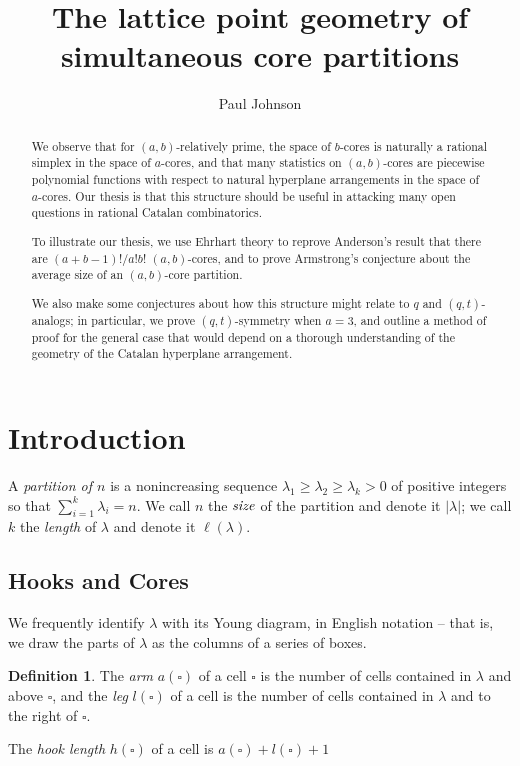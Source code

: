 \documentclass{amsart}[12pt]
\theoremstyle{definition}
\newtheorem{definition}[dummy]{Definition}
\begin{document}
\title{The lattice point geometry of simultaneous core partitions}
\begin{abstract}
We observe that for $(a,b)$-relatively prime, the space of $b$-cores is naturally a rational simplex in the space of $a$-cores, and that many statistics on $(a,b)$-cores are piecewise polynomial functions with respect to natural hyperplane arrangements in the space of $a$-cores.  Our thesis is that this structure should be useful in attacking many open questions in rational Catalan combinatorics.

To illustrate our thesis, we use Ehrhart theory to reprove Anderson's result \cite{anderson} that there are $(a+b-1)!/a!b!$ $(a,b)$-cores, and to prove Armstrong's conjecture \cite{AHJ} about the average size of an $(a,b)$-core partition.

  We also make some conjectures about how this structure might relate to $q$ and $(q,t)$-analogs; in particular, we prove $(q,t)$-symmetry when $a=3$, and outline a method of proof for the general case that would depend on a thorough understanding of the geometry of the Catalan hyperplane arrangement.
\end{abstract}


\author{Paul Johnson}
\date{}
\maketitle
\section{Introduction}

A \emph{partition of $n$} is a nonincreasing sequence $\lambda_1\geq \lambda_2\geq
\lambda_{k}> 0$ of positive integers so that $\sum_{i=1}^k \lambda_i=n$.  We
call $n$ the $\emph{size}$ of the partition and denote it $|\lambda|$; we call
$k$ the \emph{length} of $\lambda$ and denote it $\ell(\lambda)$.

\subsection{Hooks and Cores}


We frequently identify $\lambda$ with its Young diagram, in
English notation -- that is, we draw the parts of $\lambda$ as
the columns of a series of boxes.

\begin{definition}
The \emph{arm} $a(\square)$ of a cell $\square$ is the number of cells contained in $\lambda$ and above  $\square$, and the \emph{leg} $l(\square)$ of a cell is the number of cells contained in $\lambda$ and to the right of $\square$.

The \emph{hook length} $h(\square)$ of a cell is $a(\square)+l(\square)+1$
\end{definition}
\end{document}
